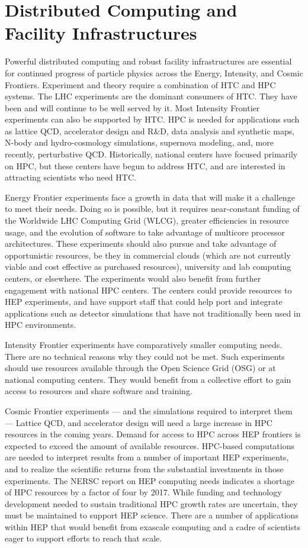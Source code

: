 \section{Distributed Computing and Facility Infrastructures}

Powerful distributed computing and robust facility infrastructures are essential for continued progress of particle physics across the Energy, Intensity, and Cosmic Frontiers.  Experiment and theory require a combination of HTC and HPC systems.  The LHC experiments are the dominant consumers of HTC.  They have been and will continue to be well served by it.  Most Intensity Frontier experiments can also be supported by HTC.  HPC is needed for applications such as lattice QCD, accelerator design and R\&D, data analysis and synthetic maps, N-body and hydro-cosmology simulations, supernova modeling, and, more recently, perturbative QCD.  Historically, national centers have focused primarily on HPC, but these centers have begun to address HTC, and are interested in attracting scientists who need HTC.

Energy Frontier experiments face a growth in data that will make it a challenge to meet their needs.  Doing so is possible, but it requires near-constant funding of the Worldwide LHC Computing Grid (WLCG), greater efficiencies in resource usage, and the evolution of software to take advantage of multicore processor architectures.   These experiments should also pursue and take advantage of opportunistic resources, be they in commercial clouds (which are not currently viable and cost effective as purchased resources), university and lab computing centers, or elsewhere.  The experiments would also benefit from further engagement with national HPC centers.  The centers could provide resources to HEP experiments, and have support staff that could help port and integrate applications such as detector simulations that have not traditionally been used in HPC environments.

Intensity Frontier experiments have comparatively smaller computing needs.  There are no technical reasons why they could not be met.  Such experiments should  use resources available through the Open Science Grid (OSG) or at national computing centers.  They would benefit from a collective effort to gain access to resources and share software and training.

Cosmic Frontier experiments --- and the simulations required to interpret them --- Lattice QCD, and accelerator design will need a large increase in HPC resources in the coming years. Demand for access to HPC across HEP frontiers is expected to exceed the amount of available resources.  HPC-based computations are needed to interpret results from a number of important HEP experiments, and to realize the scientific returns from the substantial investments in those experiments.  The NERSC report on HEP computing needs indicates a shortage of HPC resources by a factor of four by 2017.  While funding and technology development needed to sustain traditional HPC growth rates are uncertain, they must be maintained to support HEP science.  There are a number of applications within HEP that would benefit from exascale computing and a cadre of scientists eager to support efforts to reach that scale.

